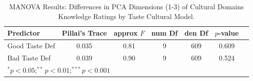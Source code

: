 \begin{table}[htpb]
\centering
\begin{tabular}{lcccccc}
\toprule
Predictor & Pillai's Trace & approx $F$ & num Df & den Df & $p$-value \\
\midrule
Good Taste Def & 0.035 & 0.81 & 9 & 609 & 0.609 \\
Bad Taste Def & 0.039 & 0.90 & 9 & 609 & 0.524 \\
\bottomrule
\multicolumn{6}{l}{\footnotesize $^{*}p<0.05; ^{**}p<0.01; ^{***}p<0.001$} \\
\end{tabular}
\caption{MANOVA Results: Differences in PCA Dimensions (1-3) of Cultural Domains Knowledge Ratings by Taste Cultural Model.}
\label{tab:anova_pca_knowledge}
\end{table}

